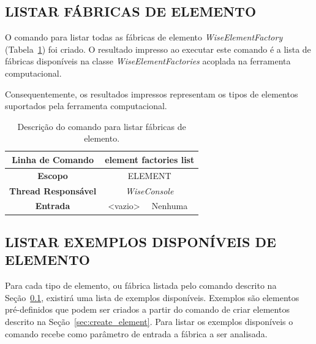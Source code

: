 \subsection{LISTAR FÁBRICAS DE ELEMENTO}\label{sec:list_element_factories}

O comando para listar todas as fábricas de elemento \textit{WiseElementFactory} (Tabela~\ref{tab:list_element_factories}) foi criado. O resultado impresso ao executar este comando é a lista de fábricas disponíveis na classe \textit{WiseElementFactories} acoplada na ferramenta computacional.

Consequentemente, os resultados impressos representam os tipos de elementos suportados pela ferramenta computacional.

\begin{center}
	\begin{table}[!htbp]
		\begin{tabularx}{\textwidth}{c|c|X}
			\toprule
			\textbf{Linha de Comando} & \multicolumn{2}{c}{element factories list} \\
			\midrule
			\textbf{Escopo} & \multicolumn{2}{c}{ELEMENT} \\
			\hline
			\textbf{Thread Responsável} & \multicolumn{2}{c}{\textit{WiseConsole}} \\
			\hline
			\textbf{Entrada} & <vazio> & Nenhuma \\
			\bottomrule
		\end{tabularx}
		\caption{Descrição do comando para listar fábricas de elemento.}
		\label{tab:list_element_factories}
	\end{table}
\end{center}

\subsection{LISTAR EXEMPLOS DISPONÍVEIS DE ELEMENTO}\label{sec:list_example_element_factories}

Para cada tipo de elemento, ou fábrica listada pelo comando descrito na Seção~\ref{sec:list_element_factories}, existirá uma lista de exemplos disponíveis. Exemplos são elementos pré-definidos que podem ser criados a partir do comando de criar elementos descrito na Seção~\ref{sec:create_element}. Para listar os exemplos disponíveis o comando recebe como parâmetro de entrada a fábrica a ser analisada.

